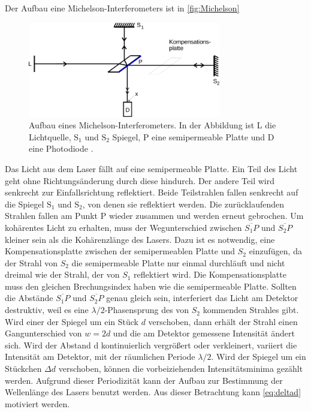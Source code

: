 Der Aufbau eine Michelson-Interferometers ist in \autoref{fig:Michelson}
\begin{figure}[H]
    \centering
    \includegraphics[width=0.75\textwidth]{figures/Abb1.pdf}
    \caption{Aufbau eines Michelson-Interferometers. In der Abbildung ist L die Lichtquelle, $\textrm{S}_1$ und $\textrm{S}_2$  Spiegel, P eine semipermeable Platte und D eine Photodiode \cite{ap11}.}
    \label{fig:Michelson}
\end{figure}

Das Licht aus dem Laser fällt auf eine semipermeable Platte. Ein Teil des Licht geht ohne Richtungsänderung durch diese hindurch. Der andere Teil wird senkrecht zur Einfallsrichtung reflektiert. 
Beide Teilstrahlen fallen  senkrecht auf die Spiegel $ \textrm{S}_1 $ und $ \textrm{S}_2 $, von denen sie reflektiert werden.
Die zurücklaufenden Strahlen fallen am Punkt P wieder zusammen und werden erneut gebrochen. 
Um kohärentes Licht zu erhalten, muss der Wegunterschied zwischen $\overline{S_1 P}$ und $\overline{S_2 P} $ kleiner sein als die Kohärenzlänge des Lasers.
Dazu ist es notwendig, eine Kompensationsplatte zwischen der semipermeablen Platte und $S_2$ einzufügen, da der Strahl von $S_2$ die semipermeable Platte nur einmal durchläuft und nicht dreimal wie der Strahl, der von $S_1$ reflektiert wird. 
Die Kompensationsplatte muss den gleichen Brechungsindex haben wie die semipermeable Platte.
Sollten die Abstände $\overline{S_1 P}$ und $\overline{S_2 P} $ genau gleich sein, interferiert das Licht am Detektor destruktiv, weil es eine $\lambda /2 $-Phasensprung des von $S_2$ kommenden Strahles gibt. \\

Wird einer der Spiegel um ein Stück $d$ verschoben, dann erhält der Strahl einen Gangunterschied von $w = 2d$ und die am Detektor gemessene Intensität ändert sich.
Wird der Abstand d kontinuierlich vergrößert oder verkleinert, variiert die Intensität am Detektor, mit der räumlichen Periode $\lambda / 2$. 
Wird der Spiegel um ein Stückchen $ \Delta d$ verschoben, können die vorbeiziehenden Intensitätsminima gezählt werden.
Aufgrund dieser Periodizität kann der Aufbau zur Bestimmung der Wellenlänge des Lasers benutzt werden. 
Aus dieser Betrachtung kann \eqref{eq:deltad} motiviert werden.

